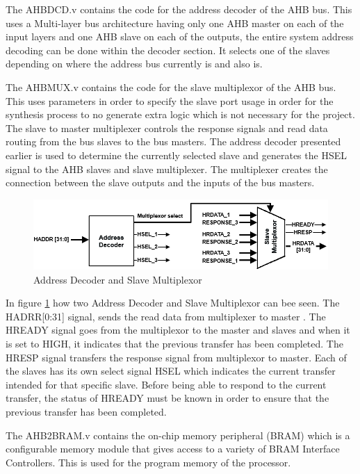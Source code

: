 The AHBDCD.v contains the code for the address decoder of the AHB bus. This uses a Multi-layer bus architecture having only one AHB master on each of the input layers and one AHB slave on each of the outputs, the entire system address decoding can be done within the decoder section. It selects one of the slaves depending on where the address bus currently is and also is.

The AHBMUX.v contains the code for the slave multiplexor of the AHB bus. This uses parameters in order to specify the slave port usage in order for the synthesis process to no generate extra logic which is not necessary for the project. The slave to master multiplexer controls the response signals and read data routing from the bus slaves to the bus masters. The address decoder presented earlier is used to determine the currently selected slave and generates the HSEL signal to the AHB slaves and slave multiplexer. The multiplexer creates the connection between the slave outputs and the inputs of the bus masters. 

\begin{figure}
\centering
\includegraphics[scale=0.7]{figures/decoder_and_multiplexer.PNG}
\caption{Address Decoder and Slave Multiplexor } 
\label{fig:decoder_multiplexer}
\end{figure}
In figure \ref{fig:decoder_multiplexer} how two Address Decoder and Slave Multiplexor can bee seen. The HADRR[0:31] signal, sends the read data from multiplexer to master \cite{ahblite}. The HREADY signal goes from the multiplexor to the master and slaves and when it is set to HIGH, it indicates that the previous transfer has been completed. The HRESP signal transfers the response signal from multiplexor to master. Each of the slaves has its own select signal HSEL which indicates the current transfer intended for that specific slave. Before being able to respond to the current transfer, the status of HREADY must be known in order to ensure that the previous transfer has been completed. 

The AHB2BRAM.v contains the on-chip memory peripheral (BRAM) 
which is a configurable memory module that gives access to a variety of BRAM Interface Controllers. This is used for the program memory of the processor.


